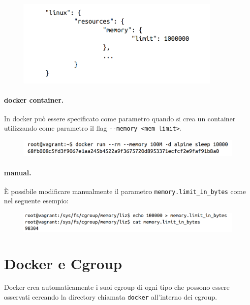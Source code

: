 \begin{figure}[H]
    \centering
    \includegraphics[width=10cm, keepaspectratio]{capitoli/os_security/imgs/limit2.png}
\end{figure}


\paragraph{docker container.} In docker può essere specificato come parametro quando
si crea un container utilizzando come parametro il flag \verb|--memory <mem limit>|.

\begin{figure}[H]
    \centering
    \includegraphics[width=\textwidth, keepaspectratio]{capitoli/os_security/imgs/limit3.png}
\end{figure}


\paragraph{manual.} È possibile modificare manualmente il parametro
\verb|memory.limit_in_bytes| come nel seguente esempio:

\begin{figure}[H]
    \centering
    \includegraphics[width=\textwidth, keepaspectratio]{capitoli/os_security/imgs/limit5.png}
\end{figure}

\section{Docker e Cgroup}

Docker crea automaticamente i suoi cgroup di ogni tipo che possono essere osservati
cercando la directory chiamata \verb|docker| all'interno dei cgroup.

